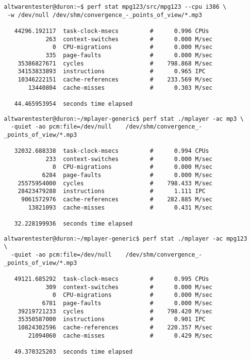 \documentclass[a4paper,12pt]{scrartcl}
\begin{document}
\begin{verbatim}
altwarentester@duron:~$ perf stat mpg123/src/mpg123 --cpu i386 \
 -w /dev/null /dev/shm/convergence_-_points_of_view/*.mp3

   44296.192117  task-clock-msecs         #      0.996 CPUs 
            263  context-switches         #      0.000 M/sec
              0  CPU-migrations           #      0.000 M/sec
            335  page-faults              #      0.000 M/sec
    35386827671  cycles                   #    798.868 M/sec
    34153833893  instructions             #      0.965 IPC  
    10346222151  cache-references         #    233.569 M/sec
       13440804  cache-misses             #      0.303 M/sec

   44.465953954  seconds time elapsed
\end{verbatim}

\begin{verbatim}
altwarentester@duron:~/mplayer-generic$ perf stat ./mplayer -ac mp3 \
  -quiet -ao pcm:file=/dev/null    /dev/shm/convergence_-_points_of_view/*.mp3

   32032.688338  task-clock-msecs         #      0.994 CPUs 
            233  context-switches         #      0.000 M/sec
              0  CPU-migrations           #      0.000 M/sec
           6284  page-faults              #      0.000 M/sec
    25575954000  cycles                   #    798.433 M/sec
    28423479288  instructions             #      1.111 IPC  
     9061572976  cache-references         #    282.885 M/sec
       13821093  cache-misses             #      0.431 M/sec

   32.228199936  seconds time elapsed
\end{verbatim}

\begin{verbatim}
altwarentester@duron:~/mplayer-generic$ perf stat ./mplayer -ac mpg123 \
  -quiet -ao pcm:file=/dev/null    /dev/shm/convergence_-_points_of_view/*.mp3

   49121.685292  task-clock-msecs         #      0.995 CPUs 
            309  context-switches         #      0.000 M/sec
              0  CPU-migrations           #      0.000 M/sec
           6781  page-faults              #      0.000 M/sec
    39219721233  cycles                   #    798.420 M/sec
    35350587000  instructions             #      0.901 IPC  
    10824302596  cache-references         #    220.357 M/sec
       21094060  cache-misses             #      0.429 M/sec

   49.370325203  seconds time elapsed
\end{verbatim}
\end{document}
